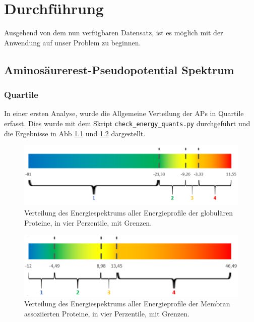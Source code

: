 \chapter{Durchführung}

Ausgehend von dem nun verfügbaren Datensatz, ist es möglich mit der Anwendung auf unser Problem zu beginnen.



\section{Aminosäurerest-Pseudopotential Spektrum}


\subsection{Quartile}
In einer ersten Analyse, wurde die Allgemeine Verteilung der \ac{APs} in Quartile erfasst. Dies wurde mit dem Skript \texttt{check\_energy\_quants.py} durchgeführt und die Ergebnisse in \ac{Abb} \ref{fig:quartiles_glob} und \ref{fig:quartiles_memb} dargestellt. 
%
\begin{figure}
\centering
\includegraphics[width=.95\textwidth]{images/Quartil_glob.png}
\caption{Verteilung des Energiespektrums aller Energieprofile der globulären Proteine, in vier Perzentile, mit Grenzen.}
\label{fig:quartiles_glob}
\end{figure}

\begin{figure}
\centering
\includegraphics[width=.95\textwidth]{images/Quartil_memb.png}
\caption{Verteilung des Energiespektrums aller Energieprofile der Membran assoziierten Proteine, in vier Perzentile, mit Grenzen.}
\label{fig:quartiles_memb}
\end{figure}

